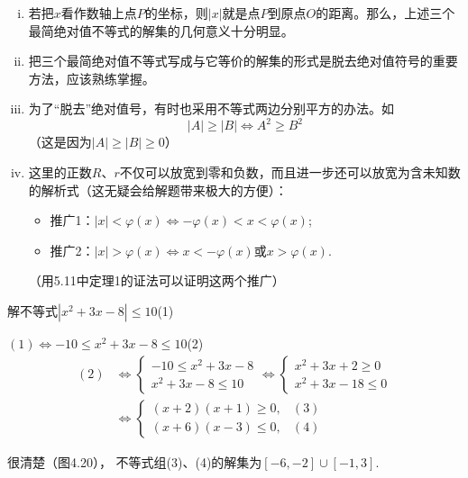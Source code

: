 \begin{note}
\begin{enumerate}[(i)]
    \item 若把$x$看作数轴上点$P$的坐标，则$|x|$就是点$P$到原点$O$的距离。那么，上述三个最简绝对值不等式的解集的几何意义十分明显。
    \item 把三个最简绝对值不等式写成与它等价的解集的形式是脱去绝对值符号的重要方法，应该熟练掌握。
    \item 为了“脱去”绝对值号，有时也采用不等式两边分别平方的办法。如
\[|A|\ge |B|\Longleftrightarrow A^2\ge B^2\]
（这是因为$|A|\ge |B|\ge 0$）
\item 这里的正数$R$、$r$不仅可以放宽到零和负数，而且进一步还可以放宽为含未知数的解析式（这无疑会给解题带来极大的方便）：
\begin{itemize}
    \item 推广1：$|x|<\varphi(x)\Longleftrightarrow -\varphi(x)<x<\varphi(x)$;
    \item 推广2：$|x|>\varphi(x)\Longleftrightarrow x<-\varphi(x)\text{或}x>\varphi(x)$.
\end{itemize}
（用5.11中定理1的证法可以证明这两个推广）
\end{enumerate}
\end{note}

\begin{example}
解不等式$|x^2+3x-8|\le 10$\hfill (1)
\end{example}

\begin{solution}
    $(1)\Longleftrightarrow -10\le x^2+3x-8\le 10 $\hfill (2)
\[\begin{split}
  (2) & \Longleftrightarrow \begin{cases}
        -10\le x^2+3x-8\\
        x^2+3x-8\le 10
    \end{cases}
     \Longleftrightarrow \begin{cases}
        x^2+3x+2\ge 0\\
        x^2+3x-18\le 0
    \end{cases}\\
    &\Longleftrightarrow \begin{cases}
        (x+2)(x+1)\ge 0,&(3)\\
        (x+6)(x-3)\le 0,&(4)
    \end{cases}
\end{split}\]

很清楚（图4.20）， 不等式组(3)、(4)的解集为$[-6,-2]\cup [-1,3]$.
\end{solution}

